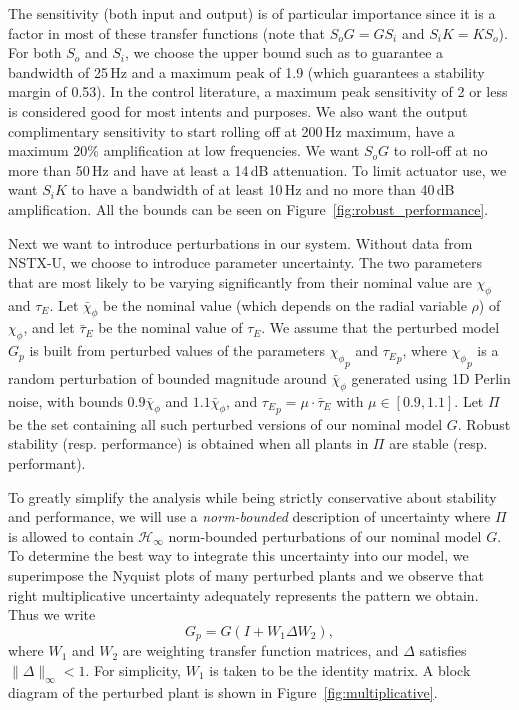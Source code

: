 \documentclass[12pt,lot, lof]{puthesis}
\begin{document}
The sensitivity (both input and output) is of particular importance since it is a factor in most of these transfer functions (note that $S_o G = G S_i$ and $S_i K = K S_o$).
For both $S_o$ and $S_i$, we choose the upper bound such as to guarantee a bandwidth of 25\,Hz and a maximum peak of 1.9 (which guarantees a stability margin of 0.53).
In the control literature, a maximum peak sensitivity of 2 or less is considered good for most intents and purposes.
We also want the output complimentary sensitivity to start rolling off at 200\,Hz maximum, have a maximum 20\% amplification at low frequencies.
We want $S_o G$ to roll-off at no more than 50\,Hz and have at least a 14\,dB attenuation.
To limit actuator use, we want $S_i K$ to have a bandwidth of at least 10\,Hz and no more than 40\,dB amplification.
All the bounds can be seen on Figure~\ref{fig:robust_performance}.

Next we want to introduce perturbations in our system.
Without data from NSTX-U, we choose to introduce parameter uncertainty.
The two parameters that are most likely to be varying significantly from their nominal value are $\chi_\phi$ and $\tau_E$.
Let $\bar{\chi}_\phi$ be the nominal value (which depends on the radial variable $\rho$) of $\chi_\phi$, and
let $\bar{\tau}_E$ be the nominal value of $\tau_E$.
We assume that the perturbed model $G_p$ is built from perturbed values of the parameters ${\chi_\phi}_p$ and ${\tau_E}_p$, where
${\chi_\phi}_p$ is a random perturbation of bounded magnitude around $\bar{\chi}_\phi$ generated using 1D Perlin noise, with bounds $0.9 \bar{\chi}_\phi$ and $1.1 \bar{\chi}_\phi$, and ${\tau_E}_p = \mu \cdot \bar{\tau}_E$ with $\mu \in [0.9,1.1]$.
Let $\Pi$ be the set containing all such perturbed versions of our nominal model $G$.
Robust stability (resp. performance) is obtained when all plants in $\Pi$ are stable (resp. performant).

To greatly simplify the analysis while being strictly conservative about stability and performance, we will use a \emph{norm-bounded} description of uncertainty where $\Pi$ is allowed to contain $\mathcal{H}_\infty$ norm-bounded perturbations of our nominal model $G$.
To determine the best way to integrate this uncertainty into our model, we superimpose the Nyquist plots of many perturbed plants and we observe that right multiplicative uncertainty adequately represents the pattern we obtain.
Thus we write
\begin{equation} \label{eq:multiplicative}
	G_p = G (I + W_1 \Delta W_2),
\end{equation}
where $W_1$ and $W_2$ are weighting transfer function matrices, and $\Delta$ satisfies $\|\Delta\|_\infty < 1$.
For simplicity, $W_1$ is taken to be the identity matrix.
A block diagram of the perturbed plant is shown in Figure~\ref{fig:multiplicative}.
\end{document}
